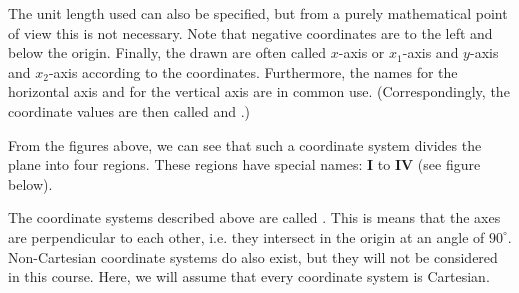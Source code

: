 \begin{MIntro}
The unit length used can also be specified, but from a purely mathematical point of view this is 
not necessary. Note that negative coordinates are to the left and below the origin.
Finally, the drawn  are often called $x$-axis or $x_1$-axis and $y$-axis and 
$x_2$-axis according to the coordinates. Furthermore, the names  for the 
horizontal axis and  for the vertical axis are in common use. (Correspondingly, 
the coordinate values are then called  and .)

From the figures above, we can see that such a coordinate system divides the plane into four regions. These regions have special 
names:  \textbf{I} to \textbf{IV} (see figure below).

\begin{center}
\end{center}

The coordinate systems described above are called 
. This is means that the axes are perpendicular to each other, 
i.e. they intersect in the origin at an angle of $90^{\circ}$. Non-Cartesian coordinate systems
do also exist, but they will not be considered in this course. Here, we will 
assume that every coordinate system is Cartesian.


\end{MIntro}
